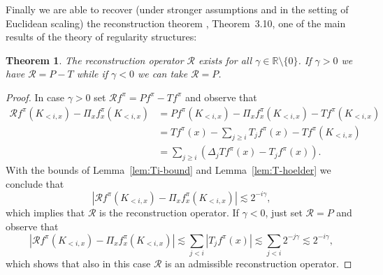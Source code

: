 \documentclass[a4paper,11pt]{article}
\newtheorem{theorem}{Theorem}[section]
\theoremstyle{remark}
\newcommand{\R}{\mathbb{R}}
\begin{document}
Finally we are able to recover (under stronger assumptions and in the setting of Euclidean scaling) the reconstruction theorem \cite{Hairer2013a}, Theorem~3.10, one of the main results of the theory of regularity structures:

\begin{theorem}
  The reconstruction operator $\mathcal R$ exists for all $\gamma \in \R \setminus \{0\}$. If
  $\gamma >0$ we have $\mathcal R=P-T$ while if $\gamma <0$ we can take $\mathcal R=P$.
\end{theorem}

\begin{proof}
  In case $\gamma >0$ set $\mathcal R f^{\pi} =P f^{\pi} -T f^{\pi}$ and observe
  that
  \begin{align*}
     \mathcal R f^{\pi} ( K_{< i,x} ) - \Pi_{x} f^{\pi}_{x} ( K_{< i,x} ) & = P f^{\pi} ( K_{< i,x} ) - \Pi_{x} f^{\pi}_{x} ( K_{< i,x} ) -T f^{\pi} ( K_{< i,x} ) \\
     & =T f^{\pi} ( x ) - \sum_{j \geqslant i} T_j f^\pi(x) -T f^{\pi} ( K_{< i,x} ) \\
     & = \sum_{j\geqslant i} ( \Delta_{j} T f^{\pi} ( x ) -T_{j} f^{\pi} ( x) ).
  \end{align*}
  With the bounds of Lemma~\ref{lem:Ti-bound} and Lemma~\ref{lem:T-hoelder} we conclude that
  \[
     | \mathcal R f^{\pi} ( K_{< i,x} ) - \Pi_{x} f^{\pi}_{x} ( K_{< i,x} ) | \lesssim 2^{-i \gamma},
  \]
  which implies that $\mathcal R$ is the reconstruction operator. If $\gamma <0$, just set $\mathcal R=P$ and observe that
  \[
     | \mathcal R f^{\pi} ( K_{< i,x} ) - \Pi_{x} f^{\pi}_{x} ( K_{<i,x} ) | \lesssim \sum_{j < i} | T_{j} f^{\pi} ( x ) | \lesssim  \sum_{j < i} 2^{-j \gamma} \lesssim 2^{-i \gamma},
  \]
  which shows that also in this case $\mathcal R$ is an admissible reconstruction operator.
\end{proof}
\end{document}
